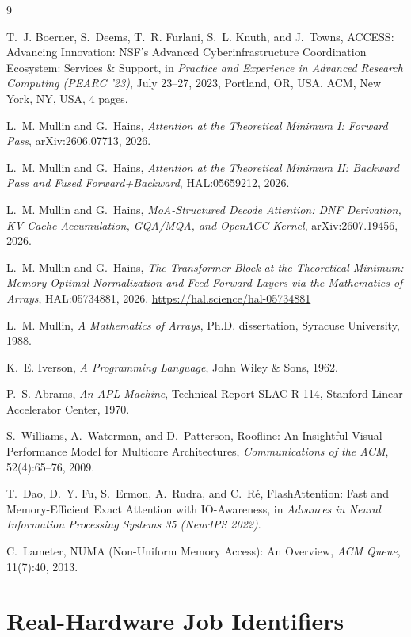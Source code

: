 \documentclass[11pt]{article}
\begin{document}
\begin{thebibliography}{9}

T.~J. Boerner, S.~Deems, T.~R. Furlani, S.~L. Knuth, and J.~Towns,
ACCESS: Advancing Innovation: NSF's Advanced Cyberinfrastructure
Coordination Ecosystem: Services \& Support,
in \emph{Practice and Experience in Advanced Research Computing
(PEARC '23)}, July 23--27, 2023, Portland, OR, USA. ACM, New York, NY,
USA, 4 pages.

L.~M. Mullin and G.~Hains,
\emph{Attention at the Theoretical Minimum I: Forward Pass},
arXiv:2606.07713, 2026.

L.~M. Mullin and G.~Hains,
\emph{Attention at the Theoretical Minimum II: Backward Pass and Fused
Forward+Backward},
HAL:05659212, 2026.

L.~M. Mullin and G.~Hains,
\emph{MoA-Structured Decode Attention: DNF Derivation, KV-Cache
Accumulation, GQA/MQA, and OpenACC Kernel},
arXiv:2607.19456, 2026.

L.~M. Mullin and G.~Hains,
\emph{The Transformer Block at the Theoretical Minimum: Memory-Optimal
Normalization and Feed-Forward Layers via the Mathematics of Arrays},
HAL:05734881, 2026. \url{https://hal.science/hal-05734881}

L.~M. Mullin,
\emph{A Mathematics of Arrays},
Ph.D. dissertation, Syracuse University, 1988.

K.~E. Iverson,
\emph{A Programming Language},
John Wiley \& Sons, 1962.

P.~S. Abrams,
\emph{An APL Machine},
Technical Report SLAC-R-114, Stanford Linear Accelerator Center, 1970.

S.~Williams, A.~Waterman, and D.~Patterson,
Roofline: An Insightful Visual Performance Model for Multicore
Architectures,
\emph{Communications of the ACM}, 52(4):65--76, 2009.

T.~Dao, D.~Y. Fu, S.~Ermon, A.~Rudra, and C.~R\'e,
FlashAttention: Fast and Memory-Efficient Exact Attention with
IO-Awareness,
in \emph{Advances in Neural Information Processing Systems 35
(NeurIPS 2022)}.

C.~Lameter,
NUMA (Non-Uniform Memory Access): An Overview,
\emph{ACM Queue}, 11(7):40, 2013.

\end{thebibliography}

\appendix
\section{Real-Hardware Job Identifiers}
\label{app:jobs}
\end{document}
